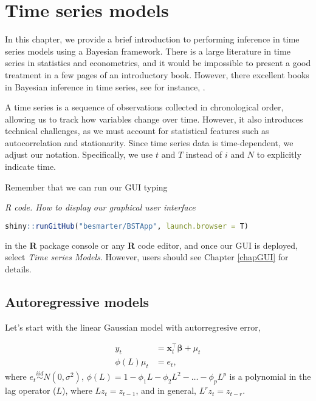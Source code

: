 \chapter{Time series models}\label{chap8}
In this chapter, we provide a brief introduction to performing inference in time series models using a Bayesian framework. There is a large literature in time series in statistics and econometrics, and it would be impossible to present a good treatment in a few pages of an introductory book. However, there excellent books in Bayesian inference in time series, see for instance, \cite{west2006bayesian,petris2009dynamic,pole2018applied}.

A time series is a sequence of observations collected in chronological order, allowing us to track how variables change over time. However, it also introduces technical challenges, as we must account for statistical features such as autocorrelation and stationarity. Since time series data is time-dependent, we adjust our notation. Specifically, we use $t$ and $T$ instead of $i$ and $N$ to explicitly indicate time.

Remember that we can run our GUI typing

\begin{tcolorbox}[enhanced,width=4.67in,center upper,
	fontupper=\large\bfseries,drop shadow southwest,sharp corners]
	\textit{R code. How to display our graphical user interface}
	\begin{VF}
		\begin{lstlisting}[language=R]
		shiny::runGitHub("besmarter/BSTApp", launch.browser = T)\end{lstlisting}
	\end{VF}
\end{tcolorbox} 

in the \textbf{R} package console or any \textbf{R} code editor, and once our GUI is deployed, select \textit{Time series Models}. However, users should see Chapter \ref{chapGUI} for details.

\section{Autoregressive models}\label{sec81}

Let's start with the linear Gaussian model with autorregresive error,

\begin{align}
	y_t & = \bm{x}_t^{\top}\bm{\beta}+\mu_t\label{eq1}\\
	\phi(L)\mu_t & = e_t \label{eq2}, 
\end{align}
where $e_t \stackrel{iid}{\sim} N(0,\sigma^2)$, $\phi(L)=1-\phi_1L-\phi_2L^2-\dots-\phi_pL^p$ is a polynomial in the lag operator ($L$), where $Lz_t=z_{t-1}$, and in general, $L^rz_t=z_{t-r}$.

